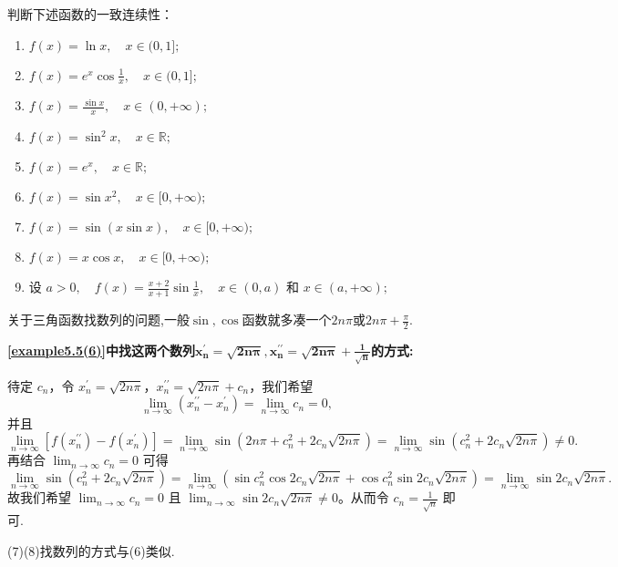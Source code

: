\documentclass[lang=cn,newtx,10pt,scheme=chinese]{elegantbook}
\begin{document}
\begin{example}
判断下述函数的一致连续性：
\begin{enumerate}[(1)]
\item \( f(x) = \ln x, \quad x \in (0, 1]; \)

\item \( f(x) = e^x \cos \frac{1}{x}, \quad x \in (0, 1]; \)

\item \( f(x) = \frac{\sin x}{x}, \quad x \in (0, +\infty); \)

\item \( f(x) = \sin^2 x, \quad x \in \mathbb{R}; \)

\item \( f(x) = e^x, \quad x \in \mathbb{R}; \)

\item \( f(x) = \sin x^2, \quad x \in [0, +\infty); \)

\item \( f(x) = \sin (x \sin x), \quad x \in [0, +\infty); \)

\item \( f(x) = x \cos x, \quad x \in [0, +\infty); \)

\item 设 \( a > 0, \quad f(x) = \frac{x+2}{x+1} \sin \frac{1}{x}, \quad x \in (0, a) \) 和 \( x \in (a, +\infty); \)
\end{enumerate}
\end{example}
\begin{note}
关于三角函数找数列的问题,一般$\sin,\cos$函数就多凑一个$2n\pi$或$2n\pi+\frac{\pi}{2}$.
\end{note}
\begin{remark}
\hypertarget{找这两个数列的方法}{\textbf{\ref{example5.5(6)}中找这两个数列$\boldsymbol{x}_{\boldsymbol{n}}^{\prime}=\sqrt{\mathbf{2}\boldsymbol{n\pi }},\boldsymbol{x}_{\boldsymbol{n}}^{\prime\prime}=\sqrt{\mathbf{2}\boldsymbol{n\pi }}+\frac{\mathbf{1}}{\sqrt{\boldsymbol{n}}}$的方式:}}待定 $c_n$，令 $x_{n}^{\prime} = \sqrt{2n\pi}$，$x_{n}^{\prime\prime} = \sqrt{2n\pi} + c_n$，我们希望
\[
\lim_{n \rightarrow \infty} \left( x_{n}^{\prime\prime} - x_{n}^{\prime} \right) = \lim_{n \rightarrow \infty} c_n = 0,
\]
并且
\[
\lim_{n \rightarrow \infty} \left[ f\left( x_{n}^{\prime\prime} \right) - f\left( x_{n}^{\prime} \right) \right] = \lim_{n \rightarrow \infty} \sin \left( 2n\pi + c_{n}^{2} + 2c_n \sqrt{2n\pi} \right) = \lim_{n \rightarrow \infty} \sin \left( c_{n}^{2} + 2c_n \sqrt{2n\pi} \right) \ne 0.
\]
再结合 $\lim_{n \rightarrow \infty} c_n = 0$ 可得
\[
\lim_{n \rightarrow \infty} \sin \left( c_{n}^{2} + 2c_n \sqrt{2n\pi} \right) = \lim_{n \rightarrow \infty} \left( \sin c_{n}^{2} \cos 2c_n \sqrt{2n\pi} + \cos c_{n}^{2} \sin 2c_n \sqrt{2n\pi} \right) = \lim_{n \rightarrow \infty} \sin 2c_n \sqrt{2n\pi}.
\]
故我们希望 $\lim_{n \rightarrow \infty} c_n = 0$ 且 $\lim_{n \rightarrow \infty} \sin 2c_n \sqrt{2n\pi} \ne 0$。从而令 $c_n = \frac{1}{\sqrt{n}}$ 即可.

(7)(8)找数列的方式与(6)类似.
\end{remark}
\end{document}
